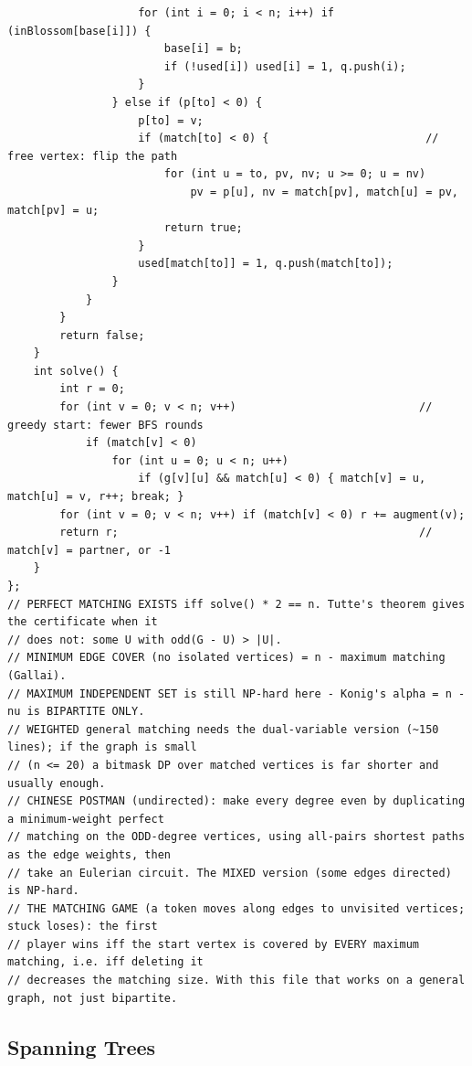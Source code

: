 \documentclass[9pt,a4paper,twocolumn]{extarticle}
\begin{document}
\begin{lstlisting}
                    for (int i = 0; i < n; i++) if (inBlossom[base[i]]) {
                        base[i] = b;
                        if (!used[i]) used[i] = 1, q.push(i);
                    }
                } else if (p[to] < 0) {
                    p[to] = v;
                    if (match[to] < 0) {                        // free vertex: flip the path
                        for (int u = to, pv, nv; u >= 0; u = nv)
                            pv = p[u], nv = match[pv], match[u] = pv, match[pv] = u;
                        return true;
                    }
                    used[match[to]] = 1, q.push(match[to]);
                }
            }
        }
        return false;
    }
    int solve() {
        int r = 0;
        for (int v = 0; v < n; v++)                            // greedy start: fewer BFS rounds
            if (match[v] < 0)
                for (int u = 0; u < n; u++)
                    if (g[v][u] && match[u] < 0) { match[v] = u, match[u] = v, r++; break; }
        for (int v = 0; v < n; v++) if (match[v] < 0) r += augment(v);
        return r;                                              // match[v] = partner, or -1
    }
};
// PERFECT MATCHING EXISTS iff solve() * 2 == n. Tutte's theorem gives the certificate when it
// does not: some U with odd(G - U) > |U|.
// MINIMUM EDGE COVER (no isolated vertices) = n - maximum matching (Gallai).
// MAXIMUM INDEPENDENT SET is still NP-hard here - Konig's alpha = n - nu is BIPARTITE ONLY.
// WEIGHTED general matching needs the dual-variable version (~150 lines); if the graph is small
// (n <= 20) a bitmask DP over matched vertices is far shorter and usually enough.
// CHINESE POSTMAN (undirected): make every degree even by duplicating a minimum-weight perfect
// matching on the ODD-degree vertices, using all-pairs shortest paths as the edge weights, then
// take an Eulerian circuit. The MIXED version (some edges directed) is NP-hard.
// THE MATCHING GAME (a token moves along edges to unvisited vertices; stuck loses): the first
// player wins iff the start vertex is covered by EVERY maximum matching, i.e. iff deleting it
// decreases the matching size. With this file that works on a general graph, not just bipartite.
\end{lstlisting}

\subsection{Spanning Trees}

\filbreak
\end{document}
